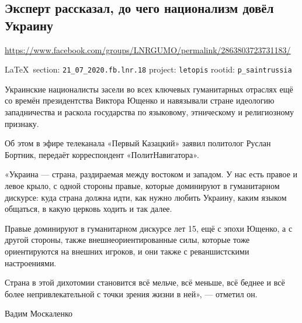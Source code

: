  
 
  
\subsection{Эксперт рассказал, до чего национализм довёл Украину}
\url{https://www.facebook.com/groups/LNRGUMO/permalink/2863803723731183/}

\vspace{0.5cm}
{\small\LaTeX~section: \verb|21_07_2020.fb.lnr.18| project: \verb|letopis| rootid: \verb|p_saintrussia|}
\vspace{0.5cm}

Украинские националисты засели во всех ключевых гуманитарных отраслях ещё со
времён президентства Виктора Ющенко и навязывали стране идеологию западничества
и раскола государства по языковому, этническому и религиозному признаку.

Об этом в эфире телеканала «Первый Казацкий» заявил политолог Руслан Бортник,
передаёт корреспондент «ПолитНавигатора».

«Украина --- страна, раздираемая между востоком и западом. У нас есть правое и
левое крыло, с одной стороны правые, которые доминируют в гуманитарном
дискурсе: куда страна должна идти, как нужно любить Украину, каким языком
общаться, в какую церковь ходить и так далее.

Правые доминируют в гуманитарном дискурсе лет 15, ещё с эпохи Ющенко, а с
другой стороны, также внешнеориентированные силы, которые тоже ориентируются на
внешних игроков, и они также с реваншистскими настроениями.

Страна в этой дихотомии становится всё мельче, всё меньше, всё беднее и всё
более непривлекательной с точки зрения жизни в ней», --- отметил он.

Вадим Москаленко
